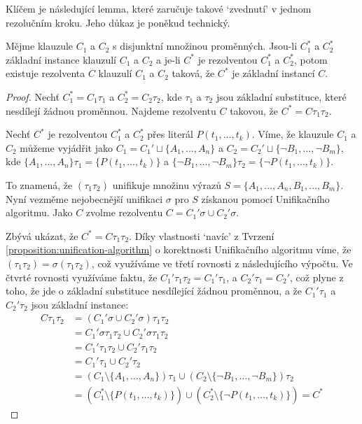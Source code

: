 Klíčem je následující lemma, které zaručuje takové `zvednutí' v jednom rezolučním kroku. Jeho důkaz je poněkud technický. 

\begin{lemma}\label{lemma:lifting-lemma}
Mějme klauzule $C_1$ a $C_2$ s disjunktní množinou proměnných. Jsou-li $C^*_1$ a $C^*_2$ základní instance klauzulí $C_1$ a $C_2$ a je-li $C^*$ je rezolventou $C^*_1$ a $C^*_2$, potom existuje rezolventa $C$ klauzulí $C_1$ a $C_2$ taková, že $C^*$ je základní instancí $C$.
\end{lemma}
\begin{proof}
Nechť $C^*_1=C_1\tau_1$ a $C^*_2=C_2\tau_2$, kde $\tau_1$ a $\tau_2$ jsou základní substituce, které nesdílejí žádnou proměnnou. Najdeme rezolventu $C$ takovou, že $C^*=C\tau_1\tau_2$.

Nechť $C^*$ je rezolventou $C_1^*$ a $C_2^*$ přes literál $P(t_1,\dots,t_k)$. Víme, že klauzule $C_1$ a $C_2$ můžeme vyjádřit jako $C_1=C_1' \sqcup \{A_1,\dots,A_n\}$ a $C_2=C_2' \sqcup \{\neg B_1,\dots,\neg B_m\}$, kde $\{A_1,\dots,A_n\}\tau_1=\{P(t_1,\dots,t_k)\}$ a $\{\neg B_1,\dots,\neg B_m\}\tau_2=\{\neg P(t_1,\dots,t_k)\}$.

To znamená, že $(\tau_1\tau_2)$ unifikuje množinu výrazů $S=\{A_1,\dots,A_n,B_1,\dots,B_m\}$. Nyní vezměme nejobecnější unifikaci $\sigma$ pro $S$ získanou pomocí Unifikačního algoritmu. Jako $C$ zvolme rezolventu $C=C_1'\sigma \cup C_2'\sigma$.

Zbývá ukázat, že $C^*=C\tau_1\tau_2$. Díky vlastnosti `navíc' z Tvrzení \ref{proposition:unification-algorithm} o korektnosti Unifikačního algoritmu víme, že $(\tau_1\tau_2)=\sigma(\tau_1\tau_2)$, což využíváme ve třetí rovnosti z následujícího výpočtu. Ve čtvrté rovnosti využíváme faktu, že $C_1'\tau_1\tau_2=C_1'\tau_1$, a $C_2'\tau_1=C_2'$, což plyne z toho, že jde o základní substituce nesdílející žádnou proměnnou, a že $C_1'\tau_1$ a $C_2'\tau_2$ jsou základní instance:
\begin{align*}
    C\tau_1\tau_2&= (C_1'\sigma \cup C_2'\sigma)\tau_1\tau_2\\
    &=C_1'\sigma\tau_1\tau_2 \cup C_2'\sigma\tau_1\tau_2\\
    &=C_1'\tau_1\tau_2 \cup C_2'\tau_1\tau_2\\
    &=C_1'\tau_1 \cup C_2'\tau_2\\
    &=(C_1\setminus\{A_1,\dots,A_n\})\tau_1\cup (C_2\setminus\{\neg B_1,\dots,\neg B_m\})\tau_2\\
    &=(C_1^*\setminus\{P(t_1,\dots,t_k)\})\cup(C_2^*\setminus \{\neg P(t_1,\dots,t_k)\})=C^*
\end{align*}
\end{proof}

